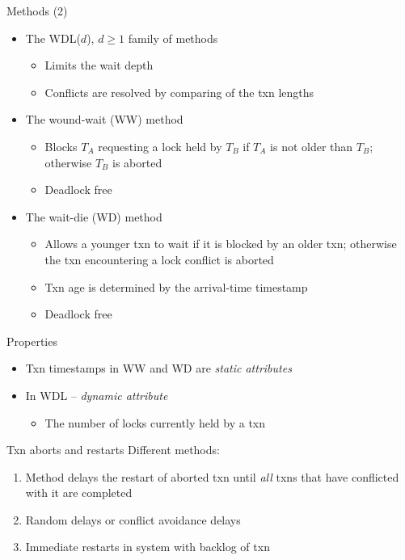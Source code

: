 \documentclass[sans]{beamer}
\begin{document}
\begin{frame}{Methods (2)}
  \begin{itemize}
    \item The WDL($d$), $d \geq 1$ family of methods
      \begin{itemize}
        \item Limits the wait depth
        \item Conflicts are resolved by comparing of the txn lengths
      \end{itemize}
    \item The wound-wait (WW) method
      \begin{itemize}
        \item Blocks $T_A$ requesting a lock held by $T_B$ if $T_A$
          is not older than $T_B$; otherwise $T_B$ is aborted
        \item Deadlock free
      \end{itemize}
    \item The wait-die (WD) method
      \begin{itemize}
        \item Allows a younger txn to wait if it is blocked by an older 
          txn; otherwise the txn encountering a lock conflict is aborted
        \item Txn age is determined by the arrival-time timestamp
        \item Deadlock free
      \end{itemize}
  \end{itemize}
\end{frame}

\begin{frame}{Properties}
  \begin{itemize}
    \item Txn timestamps in WW and WD are \emph{static attributes}
    \item In WDL -- \emph{dynamic attribute}
      \begin{itemize}
        \item The number of locks currently held by a txn
      \end{itemize}
  \end{itemize}
\end{frame}

\begin{frame}{Txn aborts and restarts}
  Different methods:
  \begin{enumerate}
    \item Method delays the restart of aborted txn until \emph{all} txns
      that have
      conflicted with it are completed
    \item Random delays or conflict avoidance delays
    \item Immediate restarts in system with backlog of txn
  \end{enumerate}
\end{frame}
\end{document}
